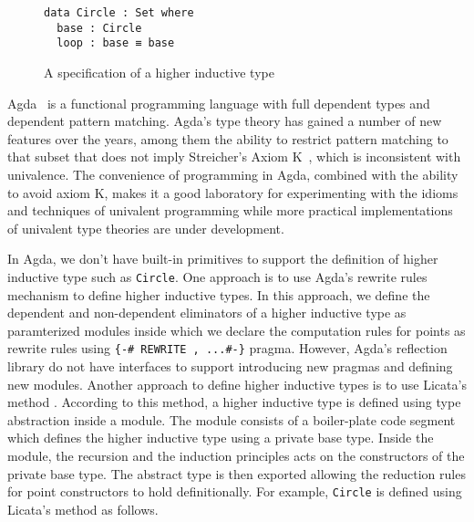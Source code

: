 \documentclass[sigplan,10pt]{acmart}
\begin{document}
\begin{figure}[h]
\begin{center}
\begin{BVerbatim}
data Circle : Set where
  base : Circle
  loop : base ≡ base
\end{BVerbatim}
\end{center}
\caption{A specification of a higher inductive type}
\label{fig:circle}
\end{figure}


Agda~\citep{norell:thesis} is a functional programming language with full dependent types and dependent pattern matching.
Agda's type theory has gained a number of new features over the years, among them the ability to restrict pattern matching to that subset that does not imply Streicher's Axiom K~\citep{Cockx2014}, which is inconsistent with univalence.
The convenience of programming in Agda, combined with the ability to avoid axiom K, makes it a good laboratory for experimenting with the idioms and techniques of univalent programming while more practical implementations of univalent type theories are under development.

In Agda, we don't have built-in primitives to support the definition of higher inductive type such as {\tt Circle}. One approach is to use Agda's rewrite rules~\citep{Cockx16} mechanism to define higher inductive types. In this approach, we define the dependent and non-dependent eliminators of a higher inductive type as paramterized modules inside which we declare the computation rules for points as rewrite rules using \Verb|{-# REWRITE , ...#-}| pragma. However, Agda's reflection library do not have interfaces to support introducing new pragmas and defining new modules. Another approach to define higher inductive types is to use Licata's method \cite{Licata-2011}. According to this method, a higher inductive type is defined using type abstraction inside a module. The module consists of a boiler-plate code segment which defines the higher inductive type using a private base type. Inside the module, the recursion and the induction principles acts on the constructors of the private base type. The abstract type is then exported allowing the reduction rules for point constructors to hold definitionally. For example, {\tt Circle} is defined using Licata's method as follows.
\end{document}

